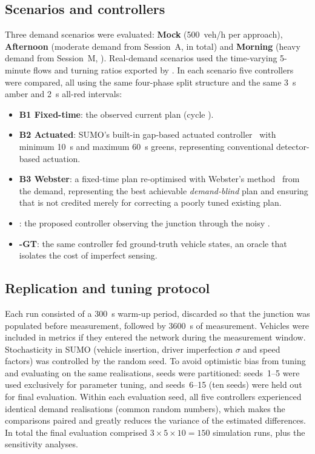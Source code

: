 \subsection{Scenarios and controllers}
Three demand scenarios were evaluated: \textbf{Mock} (500~veh/h per approach), \textbf{Afternoon} (moderate demand from Session~A,  in total) and \textbf{Morning} (heavy demand from Session~M, ). Real-demand scenarios used the time-varying 5-minute flows and turning ratios exported by \dtx{}. In each scenario five controllers were compared, all using the same four-phase split structure and the same 3~s amber and 2~s all-red intervals:
\begin{itemize}[itemsep=1pt]
  \item \textbf{B1 Fixed-time}: the observed current plan (cycle ).
  \item \textbf{B2 Actuated}: SUMO's built-in gap-based actuated controller~\cite{sumo_actuated} with minimum 10~s and maximum 60~s greens, representing conventional detector-based actuation.
  \item \textbf{B3 Webster}: a fixed-time plan re-optimised with Webster's method~\cite{webster1958} from the \dtx{} demand, representing the best achievable \emph{demand-blind} plan and ensuring that \prism{} is not credited merely for correcting a poorly tuned existing plan.
  \item \textbf{\prism{}}: the proposed controller observing the junction through the noisy \vls{}.
  \item \textbf{\prism{}-GT}: the same controller fed ground-truth vehicle states, an oracle that isolates the cost of imperfect sensing.
\end{itemize}

\subsection{Replication and tuning protocol}
Each run consisted of a 300~s warm-up period, discarded so that the junction was populated before measurement, followed by 3600~s of measurement. Vehicles were included in metrics if they entered the network during the measurement window. Stochasticity in SUMO (vehicle insertion, driver imperfection $\sigma$ and speed factors) was controlled by the random seed. To avoid optimistic bias from tuning and evaluating on the same realisations, seeds were partitioned: seeds~1--5 were used exclusively for parameter tuning, and seeds~6--15 (ten seeds) were held out for final evaluation. Within each evaluation seed, all five controllers experienced identical demand realisations (common random numbers), which makes the comparisons paired and greatly reduces the variance of the estimated differences. In total the final evaluation comprised $3 \times 5 \times 10 = 150$ simulation runs, plus the sensitivity analyses.

